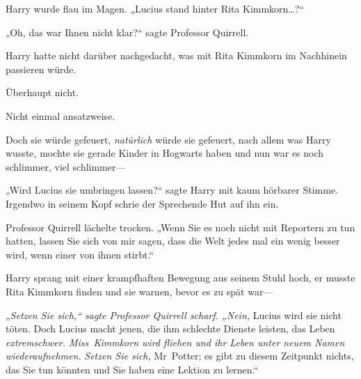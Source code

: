 Harry wurde flau im Magen. „Lucius stand hinter Rita Kimmkorn…?“

„Oh, das war Ihnen nicht klar?“ sagte Professor Quirrell.

Harry hatte nicht darüber nachgedacht, was mit Rita Kimmkorn im Nachhinein passieren würde.

Überhaupt nicht.

Nicht einmal ansatzweise.

Doch sie würde gefeuert, \emph{natürlich} würde sie gefeuert, nach allem was Harry wusste, mochte sie gerade Kinder in Hogwarts haben und nun war es noch schlimmer, viel schlimmer—

„Wird Lucius sie umbringen lassen?“ sagte Harry mit kaum hörbarer Stimme. Irgendwo in seinem Kopf schrie der Sprechende Hut auf ihn ein.

Professor Quirrell lächelte trocken. „Wenn Sie es noch nicht mit Reportern zu tun hatten, lassen Sie sich von mir sagen, dass die Welt jedes mal ein wenig besser wird, wenn einer von ihnen stirbt.“

Harry sprang mit einer krampfhaften Bewegung aus seinem Stuhl hoch, er musste Rita Kimmkorn finden und sie warnen, bevor es zu spät war—

„\emph{Setzen Sie sich,“ sagte Professor Quirrell scharf. „Nein,} Lucius wird sie nicht töten. Doch Lucius macht jenen, die ihm schlechte Dienste leisten, das Leben \emph{extremschwer. Miss~Kimmkorn wird fliehen und ihr Leben unter neuem Namen wiederaufnehmen.} \emph{Setzen Sie sich,} Mr~Potter; es gibt zu diesem Zeitpunkt nichts, das Sie tun könnten und Sie haben eine Lektion zu lernen.“

